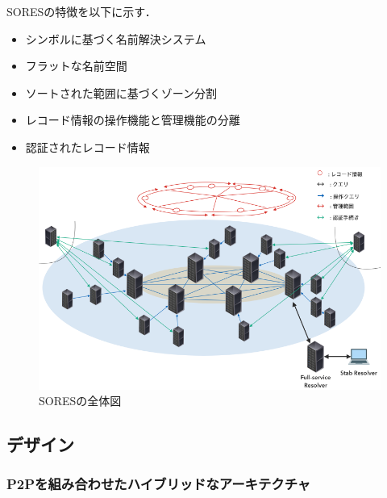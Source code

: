 SORESの特徴を以下に示す．
\begin{itemize}
 \item シンボルに基づく名前解決システム
 \vspace{-3mm}
 \item フラットな名前空間
 \vspace{-3mm}
 \item ソートされた範囲に基づくゾーン分割
 \vspace{-3mm}
 \item レコード情報の操作機能と管理機能の分離
 \vspace{-3mm}
 \item 認証されたレコード情報
\end{itemize}

\begin{figure}[t]
 \centering
 \label{fig:abstruct-SORES-architecture}
 \includegraphics[scale=0.5]{figure/abstruct-architecture.png}
 \caption{SORESの全体図}
\end{figure}


\subsection{デザイン}
\subsubsection{P2Pを組み合わせたハイブリッドなアーキテクチャ}

